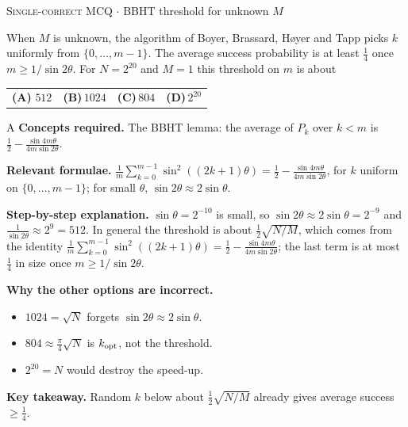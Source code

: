 \documentclass[11pt,a4paper]{article}
\newcommand{\optlabel}[1]{\textbf{(#1)}}
\newcommand{\correctlabel}[1]{\textcolor{okgreen}{\textbf{(#1)}\,\ding{51}}}
\newenvironment{qitem}[1]{\begin{list}{}{\setlength{\leftmargin}{3.3em}\setlength{\labelwidth}{3.1em}%
  \setlength{\labelsep}{0.2em}\setlength{\topsep}{3pt}\setlength{\parsep}{3pt}}\item[\textbf{Q.#1}\hfill]}{\end{list}}
\newcommand{\qsep}{\par\vspace{2pt}{\color{black!15}\hrule}\vspace{4pt}}
\newcommand{\qmeta}[2]{{\footnotesize\color{black!60}\textsc{#1} \;$\cdot$\; #2}\par}
\begin{document}
\begin{qitem}{62}
\qmeta{Single-correct MCQ}{BBHT threshold for unknown $M$}
When $M$ is unknown, the algorithm of Boyer, Brassard, H{\o}yer and Tapp picks $k$ uniformly from $\{0, \dots, m-1\}$. The average success probability is at least $\frac14$ once $m \ge 1/\sin2\theta$.
For $N = 2^{20}$ and $M = 1$ this threshold on $m$ is about
\par\smallskip\noindent\begin{tabularx}{\linewidth}{@{}*{4}{L}@{}}
\correctlabel{A}\,$512$ & \optlabel{B}\,$1024$ & \optlabel{C}\,$804$ & \optlabel{D}\,$2^{20}$
\end{tabularx}
\end{qitem}
\begin{solbox}{A}
\textbf{\color{brand}Concepts required.} The BBHT lemma: the average of $P_k$ over $k < m$ is $\frac12 - \frac{\sin4m\theta}{4m\sin2\theta}$.

\textbf{\color{brand}Relevant formulae.} $\frac1m\sum_{k=0}^{m-1}\sin^2((2k+1)\theta) = \frac12 - \frac{\sin4m\theta}{4m\sin2\theta}$, for $k$ uniform on $\{0, \dots, m-1\}$; for small $\theta$, $\sin2\theta \approx 2\sin\theta$.

\textbf{\color{brand}Step-by-step explanation.} $\sin\theta = 2^{-10}$ is small, so $\sin 2\theta \approx 2\sin\theta = 2^{-9}$ and $\frac{1}{\sin2\theta} \approx 2^{9} = 512$. In general the threshold is about $\frac12\sqrt{N/M}$, which comes from the identity
$\frac1m\sum_{k=0}^{m-1}\sin^2((2k+1)\theta) = \frac12 - \frac{\sin 4m\theta}{4m\sin2\theta}$; the last term is at most $\frac14$ in size once $m \ge 1/\sin2\theta$.

\textbf{\color{brand}Why the other options are incorrect.}
\begin{itemize}[leftmargin=2.4em, itemsep=1pt, topsep=2pt]
\item[\textbf{(B)}] $1024 = \sqrt N$ forgets $\sin2\theta \approx 2\sin\theta$.
\item[\textbf{(C)}] $804 \approx \frac\pi4\sqrt N$ is $k_{\rm opt}$, not the threshold.
\item[\textbf{(D)}] $2^{20} = N$ would destroy the speed-up.
\end{itemize}
\textbf{\color{brand}Key takeaway.} Random $k$ below about $\frac12\sqrt{N/M}$ already gives average success $\ge \frac14$.
\end{solbox}
\qsep
\end{document}
